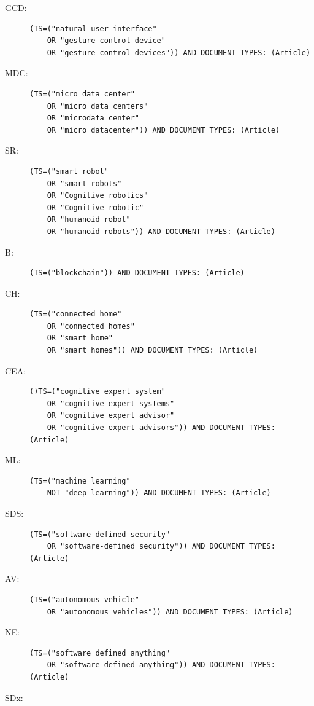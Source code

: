 \begin{description}
	\item[GCD:] \begin{verbatim}(TS=("natural user interface"
	OR "gesture control device"
	OR "gesture control devices")) AND DOCUMENT TYPES: (Article)\end{verbatim}
	\item[MDC:] \begin{verbatim}(TS=("micro data center"
	OR "micro data centers"
	OR "microdata center"
	OR "micro datacenter")) AND DOCUMENT TYPES: (Article)\end{verbatim}
	\item[SR:] \begin{verbatim}(TS=("smart robot"
	OR "smart robots"
	OR "Cognitive robotics"
	OR "Cognitive robotic"
	OR "humanoid robot"
	OR "humanoid robots")) AND DOCUMENT TYPES: (Article) \end{verbatim}
	\item[B:] \begin{verbatim}(TS=("blockchain")) AND DOCUMENT TYPES: (Article)\end{verbatim}
	\item[CH:] \begin{verbatim}(TS=("connected home"
	OR "connected homes"
	OR "smart home"
	OR "smart homes")) AND DOCUMENT TYPES: (Article)\end{verbatim}
	\item[CEA:] \begin{verbatim}()TS=("cognitive expert system"
	OR "cognitive expert systems"
	OR "cognitive expert advisor"
	OR "cognitive expert advisors")) AND DOCUMENT TYPES: (Article)\end{verbatim}
	\item[ML:] \begin{verbatim}(TS=("machine learning"
	NOT "deep learning")) AND DOCUMENT TYPES: (Article)\end{verbatim}
	\item[SDS:] \begin{verbatim}(TS=("software defined security"
	OR "software-defined security")) AND DOCUMENT TYPES: (Article)\end{verbatim}
	\item[AV:] \begin{verbatim}(TS=("autonomous vehicle"
	OR "autonomous vehicles")) AND DOCUMENT TYPES: (Article)\end{verbatim}
	\item[NE:] \begin{verbatim}(TS=("software defined anything"
	OR "software-defined anything")) AND DOCUMENT TYPES: (Article)\end{verbatim}
	\item[SDx:] \begin{verbatim}\end{verbatim}
\end{description}

